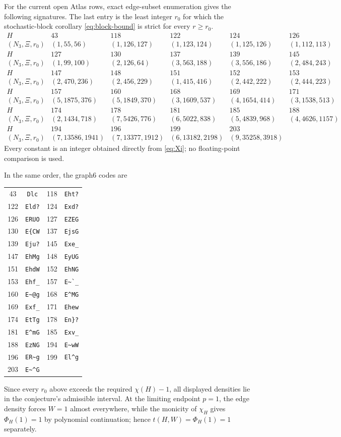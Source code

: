 \documentclass[11pt]{article}
\begin{document}
For the current open Atlas rows, exact edge-subset enumeration gives the
following signatures.  The last entry is the least integer $r_0$ for which
the stochastic-block corollary \eqref{eq:block-bound} is strict for every
$r\geq r_0$.
\[
\begin{array}{c|rrrrr}
H&43&118&122&124&126\\
(N_3,\Xi,r_0)&(1,55,56)&(1,126,127)&(1,123,124)&(1,125,126)&(1,112,113)\\ \hline
H&127&130&137&139&145\\
(N_3,\Xi,r_0)&(1,99,100)&(2,126,64)&(3,563,188)&(3,556,186)&(2,484,243)\\ \hline
H&147&148&151&152&153\\
(N_3,\Xi,r_0)&(2,470,236)&(2,456,229)&(1,415,416)&(2,442,222)&(2,444,223)\\ \hline
H&157&160&168&169&171\\
(N_3,\Xi,r_0)&(5,1875,376)&(5,1849,370)&(3,1609,537)&(4,1654,414)&(3,1538,513)\\ \hline
H&174&178&181&185&188\\
(N_3,\Xi,r_0)&(2,1434,718)&(7,5426,776)&(6,5022,838)&(5,4839,968)&(4,4626,1157)\\ \hline
H&194&196&199&203&\\
(N_3,\Xi,r_0)&(7,13586,1941)&(7,13377,1912)&(6,13182,2198)&(9,35258,3918)&
\end{array}
\]
Every constant is an integer obtained directly from \eqref{eq:Xi}; no
floating-point comparison is used.

In the same order, the graph6 codes are
\begin{center}
\begin{tabular}{c|c@{\qquad}c|c}
43&\verb|Dlc|&118&\verb|Eht?|\\
122&\verb|Eld?|&124&\verb|Exd?|\\
126&\verb|ERUO|&127&\verb|EZEG|\\
130&\verb|E{CW|&137&\verb|EjsG|\\
139&\verb|Eju?|&145&\verb|Exe_|\\
147&\verb|EhMg|&148&\verb|EyUG|\\
151&\verb|EhdW|&152&\verb|EhNG|\\
153&\verb|Ehf_|&157&\verb|E~`_|\\
160&\verb|E~@g|&168&\verb|E^MG|\\
169&\verb|Exf_|&171&\verb|Ehew|\\
174&\verb|EtTg|&178&\verb|En}?|\\
181&\verb|E^mG|&185&\verb|Exv_|\\
188&\verb|EzNG|&194&\verb|E~wW|\\
196&\verb|ER~g|&199&\verb|El^g|\\
203&\verb|E~^G|&&
\end{tabular}
\end{center}
Since every $r_0$ above exceeds the required $\chi(H)-1$, all displayed
densities lie in the conjecture's admissible interval.  At the limiting
endpoint $p=1$, the edge density forces $W=1$ almost everywhere, while the
monicity of $\chi_H$ gives $\Phi_H(1)=1$ by polynomial continuation; hence
$t(H,W)=\Phi_H(1)=1$ separately.
\end{document}
